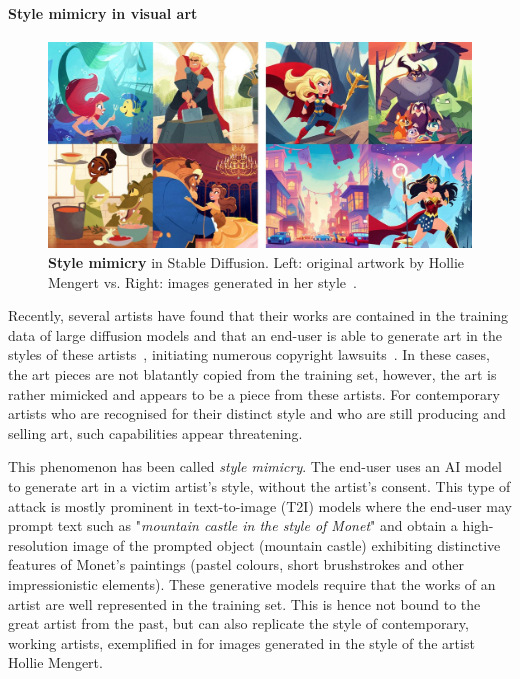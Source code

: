 \documentclass[conference,table]{IEEEtran}
\begin{document}
\paragraph{Style mimicry in visual art}
\begin{figure}[ht]
    \centering
    \includegraphics[width=\linewidth]{figures/mimicry.jpg}
    \caption{\textbf{Style mimicry} in Stable Diffusion. Left: original artwork by Hollie Mengert vs. Right: images generated in her style~\cite{baio_invasive_2022}.}
    \label{fig:style-mimicry}
\end{figure}
Recently, several artists have found that their works are contained in the training data of large diffusion models and that an end-user is able to generate art in the styles of these artists~\cite{mit_technology_review_this_2022}, initiating numerous copyright lawsuits~\cite{nolan_ai_2023}.
In these cases, the art pieces are not blatantly copied from the training set, however, the art is rather mimicked and appears to be a piece from these artists.
For contemporary artists who are recognised for their distinct style and who are still producing and selling art, such capabilities appear threatening.  

This phenomenon has been called \textit{style mimicry}. The end-user uses an AI model to generate art in a victim artist's style, without the artist's consent. 
This type of attack is mostly prominent in text-to-image (T2I) models where the end-user may prompt text such as "\textit{mountain castle in the style of Monet}" and obtain a high-resolution image of the prompted object (mountain castle) exhibiting distinctive features of Monet's paintings (pastel colours, short brushstrokes and other impressionistic elements). 
These generative models require that the works of an artist are well represented in the training set. This is hence not bound to the great artist from the past, but can also replicate the style of contemporary, working artists, exemplified in  for images generated in the style of the artist Hollie Mengert.
 
\end{document}
